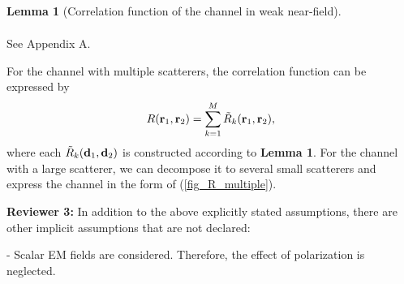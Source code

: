 \documentclass[a4paper,12pt]{article}
\newtheorem{lemma}{\bf Lemma}
\newenvironment{IEEEproof}{{\it Proof. }}{}
\begin{document}
\begin{framed}
\begin{lemma}[{\color{red}Correlation function of the channel in weak near-field}]
\begin{equation}
\begin{aligned}
	   \end{aligned}
   \end{equation}
   \fi
	\end{lemma}
	\begin{IEEEproof}
	See Appendix A.
	\end{IEEEproof}

\quad For the channel with multiple scatterers, the correlation function can be expressed by
\begin{equation}
	\begin{aligned}
		R({\bf r}_1,{\bf r}_2) = \sum_{k=1}^{M}\tilde{R}_k({\bf r}_1,{\bf r}_2),
	\end{aligned}
	\label{fig_R_multiple}
\end{equation}		
where each $\tilde{R}_k({\bf d}_1,{\bf d}_2)$ is constructed according to {\bf Lemma 1}. {\color{red}For the channel with a large scatterer, we can decompose it to several small scatterers and express the channel in the form of (\ref{fig_R_multiple}).}
    
\end{framed}

\textbf{Reviewer 3:}
In addition to the above explicitly stated assumptions, there are other implicit assumptions that are not declared:

-   Scalar EM fields are considered. Therefore, the effect of polarization is neglected.

{}
\end{document}
